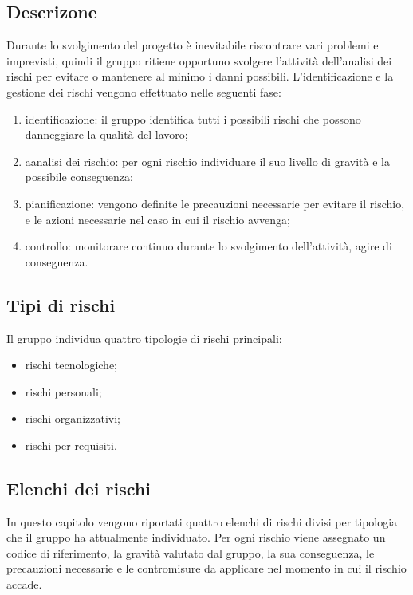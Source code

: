 \subsection{Descrizone}
Durante lo svolgimento del progetto è inevitabile riscontrare vari problemi e imprevisti, quindi il gruppo ritiene opportuno svolgere l’attività dell’analisi dei rischi per evitare o mantenere al minimo i danni possibili.\newline
L’identificazione e la gestione dei rischi vengono effettuato nelle seguenti fase:
\begin{enumerate}
\item identificazione:  il gruppo identifica tutti i possibili rischi che possono danneggiare la qualità del lavoro;
\item aanalisi dei rischio: per ogni rischio individuare il suo livello di gravità e la possibile conseguenza;
\item pianificazione: vengono definite le precauzioni necessarie per evitare il rischio, e le azioni necessarie nel caso in cui il rischio avvenga;
\item controllo: monitorare continuo durante lo svolgimento dell’attività, agire di conseguenza.
\end{enumerate}

\subsection{Tipi di rischi}
Il gruppo individua quattro tipologie di rischi principali:
\begin{itemize}
\item rischi tecnologiche;
\item rischi personali;
\item rischi organizzativi;
\item rischi per requisiti.
\end{itemize}

\subsection{Elenchi dei rischi}
In questo capitolo vengono riportati quattro elenchi di rischi divisi per tipologia che il gruppo ha attualmente individuato.
Per ogni rischio viene assegnato un codice di riferimento, la gravità valutato dal gruppo, la sua conseguenza, le precauzioni necessarie e le contromisure da applicare nel momento in cui il rischio accade. 
